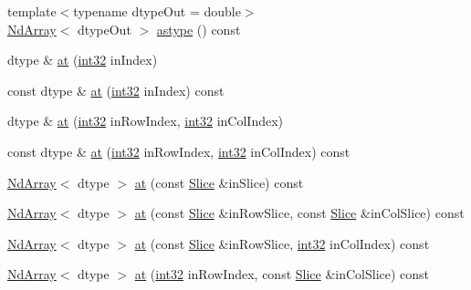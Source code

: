 \begin{DoxyCompactItemize}
\item 
{\footnotesize template$<$typename dtype\+Out  = double$>$ }\\\mbox{\hyperlink{class_num_cpp_1_1_nd_array}{Nd\+Array}}$<$ dtype\+Out $>$ \mbox{\hyperlink{class_num_cpp_1_1_nd_array_a1df09cc9c8f9d3853487562f72ebd0ed}{astype}} () const
\item 
dtype \& \mbox{\hyperlink{class_num_cpp_1_1_nd_array_ab219e7a4c6d4a30e0bc387f5ac4feb12}{at}} (\mbox{\hyperlink{namespace_num_cpp_acf3eb1592f8b248ff0a236634864633c}{int32}} in\+Index)
\item 
const dtype \& \mbox{\hyperlink{class_num_cpp_1_1_nd_array_a27aa41696cef7b11549af3c8d6a5e3fd}{at}} (\mbox{\hyperlink{namespace_num_cpp_acf3eb1592f8b248ff0a236634864633c}{int32}} in\+Index) const
\item 
dtype \& \mbox{\hyperlink{class_num_cpp_1_1_nd_array_a2872127505158e882699d269ef25ef89}{at}} (\mbox{\hyperlink{namespace_num_cpp_acf3eb1592f8b248ff0a236634864633c}{int32}} in\+Row\+Index, \mbox{\hyperlink{namespace_num_cpp_acf3eb1592f8b248ff0a236634864633c}{int32}} in\+Col\+Index)
\item 
const dtype \& \mbox{\hyperlink{class_num_cpp_1_1_nd_array_ab46389e43804bab057f2446b65ee0372}{at}} (\mbox{\hyperlink{namespace_num_cpp_acf3eb1592f8b248ff0a236634864633c}{int32}} in\+Row\+Index, \mbox{\hyperlink{namespace_num_cpp_acf3eb1592f8b248ff0a236634864633c}{int32}} in\+Col\+Index) const
\item 
\mbox{\hyperlink{class_num_cpp_1_1_nd_array}{Nd\+Array}}$<$ dtype $>$ \mbox{\hyperlink{class_num_cpp_1_1_nd_array_ac5616ec092cdf5370b78f88ff82384e1}{at}} (const \mbox{\hyperlink{class_num_cpp_1_1_slice}{Slice}} \&in\+Slice) const
\item 
\mbox{\hyperlink{class_num_cpp_1_1_nd_array}{Nd\+Array}}$<$ dtype $>$ \mbox{\hyperlink{class_num_cpp_1_1_nd_array_aeec406a16fda3f982fb358e910e02a80}{at}} (const \mbox{\hyperlink{class_num_cpp_1_1_slice}{Slice}} \&in\+Row\+Slice, const \mbox{\hyperlink{class_num_cpp_1_1_slice}{Slice}} \&in\+Col\+Slice) const
\item 
\mbox{\hyperlink{class_num_cpp_1_1_nd_array}{Nd\+Array}}$<$ dtype $>$ \mbox{\hyperlink{class_num_cpp_1_1_nd_array_a00130f153d79690e60238dc530501af5}{at}} (const \mbox{\hyperlink{class_num_cpp_1_1_slice}{Slice}} \&in\+Row\+Slice, \mbox{\hyperlink{namespace_num_cpp_acf3eb1592f8b248ff0a236634864633c}{int32}} in\+Col\+Index) const
\item 
\mbox{\hyperlink{class_num_cpp_1_1_nd_array}{Nd\+Array}}$<$ dtype $>$ \mbox{\hyperlink{class_num_cpp_1_1_nd_array_a2404eb9216550459e63a6afa03874544}{at}} (\mbox{\hyperlink{namespace_num_cpp_acf3eb1592f8b248ff0a236634864633c}{int32}} in\+Row\+Index, const \mbox{\hyperlink{class_num_cpp_1_1_slice}{Slice}} \&in\+Col\+Slice) const

\end{DoxyCompactItemize}
